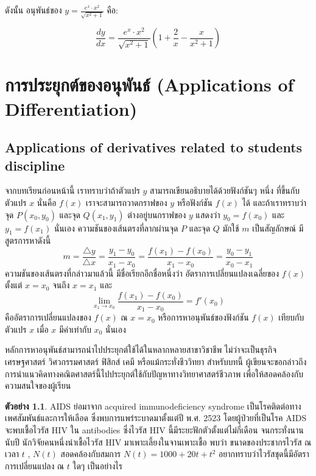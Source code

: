 \documentclass[
]{book}
\theoremstyle{definition}
\theoremstyle{definition}
\newtheorem{example}{ตัวอย่าง}[chapter]
\theoremstyle{definition}
\theoremstyle{definition}
\theoremstyle{remark}
\begin{document}
ดังนั้น อนุพันธ์ของ \(y = \frac{e^x \cdot x^2}{\sqrt{x^2 + 1}}\) คือ:

\[ \boxed{\frac{dy}{dx} = \frac{e^x \cdot x^2}{\sqrt{x^2 + 1}} \left( 1 + \frac{2}{x} - \frac{x}{x^2 + 1} \right)} \]


\chapter{การประยุกต์ของอนุพันธ์ (Applications of Differentiation)}\label{uxe01uxe32uxe23uxe1buxe23uxe30uxe22uxe01uxe15uxe02uxe2duxe07uxe2duxe19uxe1euxe19uxe18-applications-of-differentiation}

\section{Applications of derivatives related to students discipline}\label{applications-of-derivatives-related-to-students-discipline}

จากบทเรียนก่อนหน้านี้ เราทราบว่าถ้าตัวแปร \(y\) สามารถเขียนอธิบายได้ด้วยฟังก์ชันๆ หนึ่ง
ที่ขึ้นกับตัวแปร \(x\) นั่นคือ \(f(x)\) เราจะสามารถวาดกราฟของ \(y\) หรือฟังก์ชัน \(f(x)\) ได้
และถ้าเราทราบว่า จุด \(P(x_0,y_0)\) และจุด \(Q(x_1,y_1)\) ต่างอยู่บนกราฟของ \(y\)
แสดงว่า \(y_0=f(x_0)\) และ \(y_1=f(x_1)\) นั่นเอง ความชันของเส้นตรงที่ลากผ่านจุด \(P\)
และจุด \(Q\) มักใช้ \(m\) เป็นสัญลักษณ์ มีสูตรการหาดังนี้
\[m=\frac{\triangle y}{\triangle x}=\frac{y_1-y_0}{ x_1-x_0}=\frac{f(x_1)-f(x_0)}{ x_1-x_0}=\frac{y_0-y_1}{ x_0-x_1}\]
ความชันของเส้นตรงที่กล่าวมาแล้วนี้ มีชื่อเรียกอีกชื่อหนึ่งว่า อัตราการเปลี่ยนแปลงเฉลี่ยของ
\(f(x)\) ตั้งแต่ \(x=x_0\) จนถึง \(x=x_1\) และ
\[\lim_{x_1 \rightarrow x_0} \frac{f(x_1)-f(x_0)}{ x_1-x_0} =f'(x_0)\]
คืออัตราการเปลี่ยนแปลงของ \(f(x)\) ณ \(x=x_0\) หรือการหาอนุพันธ์ของฟังก์ชัน \(f(x)\)
เทียบกับตัวแปร \(x\) เมื่อ \(x\) มีค่าเท่ากับ \(x_0\) นั่นเอง

หลักการหาอนุพันธ์สามารถนำไปประยุกต์ใช้ได้ในหลากหลายสาขาวิชาชีพ ไม่ว่าจะเป็นธุรกิจ
เศรษฐศาสตร์ วิศวกรรมศาสตร์ ฟิสิกส์ เคมี หรือแม้กระทั่งชีววิทยา สำหรับบทนี้
ผู้เขียนจะขอกล่าวถึง การนำแนวคิดทางคณิตศาสตร์นี้ไปประยุกต์ใช้กับปัญหาทางวิทยาศาสตร์ชีวภาพ
เพื่อให้สอดคล้องกับความสนใจของผู้เรียน

\begin{example}
AIDS ย่อมาจาก acquired immunodeficiency syndrome
เป็นโรคติดต่อทางเพศสัมพันธ์และการให้เลือด ซึ่งพบการแพร่ระบาดมาตั้งแต่ปี พ.ศ. 2523
โดยผู้ป่วยที่เป็นโรค AIDS จะพบเชื้อไวรัส HIV ใน antibodies ซึ่งไวรัส HIV
นี้มีระยะฟักตัวตั้งแต่ไม่กี่เดือน จนกระทั่งนานนับปี นักวิจัยคนหนึ่งนำเชื้อไวรัส HIV
มาเพาะเลี้ยงในจานเพาะเชื้อ พบว่า ขนาดของประชากรไวรัส ณ เวลา \(t\) , \(N(t)\)
สอดคล้องกับสมการ \(N(t)=1000+20t+t^2\) อยากทราบว่าไวรัสชุดนี้มีอัตราการเปลี่ยนแปลง ณ
\(t\) ใดๆ เป็นอย่างไร
\end{example}
\end{document}
